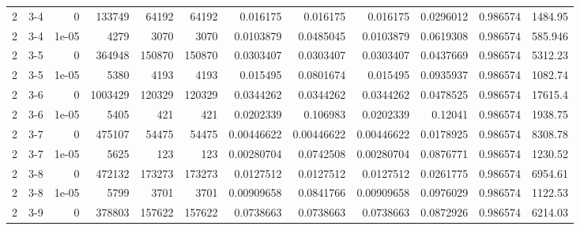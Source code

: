 \begin{tabular}{rlrrrrrrrrrr}
     2 & 3-4    &      0     &      133749 &             64192 &             64192 &     0.016175    &     0.016175    &      0.016175    &        0.0296012 &               0.986574 &         1484.95    \\
     2 & 3-4    &      1e-05 &        4279 &              3070 &              3070 &     0.0103879   &     0.0485045   &      0.0103879   &        0.0619308 &               0.986574 &          585.946   \\
     2 & 3-5    &      0     &      364948 &            150870 &            150870 &     0.0303407   &     0.0303407   &      0.0303407   &        0.0437669 &               0.986574 &         5312.23    \\
     2 & 3-5    &      1e-05 &        5380 &              4193 &              4193 &     0.015495    &     0.0801674   &      0.015495    &        0.0935937 &               0.986574 &         1082.74    \\
     2 & 3-6    &      0     &     1003429 &            120329 &            120329 &     0.0344262   &     0.0344262   &      0.0344262   &        0.0478525 &               0.986574 &        17615.4     \\
     2 & 3-6    &      1e-05 &        5405 &               421 &               421 &     0.0202339   &     0.106983    &      0.0202339   &        0.12041   &               0.986574 &         1938.75    \\
     2 & 3-7    &      0     &      475107 &             54475 &             54475 &     0.00446622  &     0.00446622  &      0.00446622  &        0.0178925 &               0.986574 &         8308.78    \\
     2 & 3-7    &      1e-05 &        5625 &               123 &               123 &     0.00280704  &     0.0742508   &      0.00280704  &        0.0876771 &               0.986574 &         1230.52    \\
     2 & 3-8    &      0     &      472132 &            173273 &            173273 &     0.0127512   &     0.0127512   &      0.0127512   &        0.0261775 &               0.986574 &         6954.61    \\
     2 & 3-8    &      1e-05 &        5799 &              3701 &              3701 &     0.00909658  &     0.0841766   &      0.00909658  &        0.0976029 &               0.986574 &         1122.53    \\
     2 & 3-9    &      0     &      378803 &            157622 &            157622 &     0.0738663   &     0.0738663   &      0.0738663   &        0.0872926 &               0.986574 &         6214.03    \\

\end{tabular}
